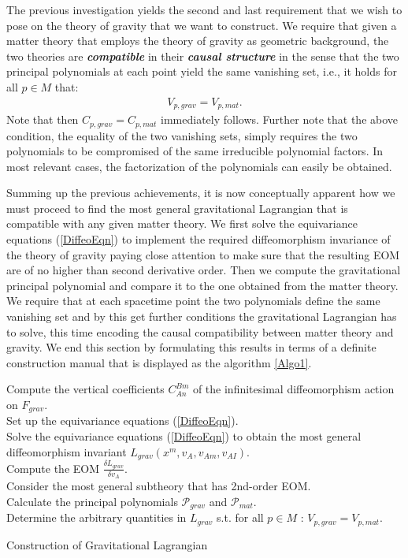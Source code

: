 The previous investigation yields the second and last requirement that we wish to pose on the theory of gravity that we want to construct. We require that given a matter theory that employs the theory of gravity as geometric background, the two theories are \textit{\textbf{compatible}} in their \textit{\textbf{causal structure}} in the sense that the two principal polynomials at each point yield the same vanishing set, i.e., it holds for all $p \in M$ that: 
\begin{align}
    V_{p,grav} = V_{p,mat}.
\end{align}
Note that then $C_{p,grav} = C_{p,mat}$ immediately follows. Further note that the above condition, the equality of the two vanishing sets, simply requires the two polynomials to be compromised of the same irreducible polynomial factors. In most relevant cases, the factorization of the polynomials can easily be obtained.


Summing up the previous achievements, it is now conceptually apparent how we must proceed to find the most general gravitational Lagrangian that is compatible with any given matter theory. We first solve the equivariance equations (\ref{DiffeoEqn}) to implement the required diffeomorphism invariance of the theory of gravity paying close attention to make sure that the resulting EOM are of no higher than second derivative order. Then we compute the gravitational principal polynomial and compare it to the one obtained from the matter theory. We require that at each spacetime point the two polynomials define the same vanishing set and by this get further conditions the gravitational Lagrangian has to solve, this time encoding the causal compatibility between matter theory and gravity.
We end this section by formulating this results in terms of a definite construction manual that is displayed as the algorithm \ref{Algo1}.
\begin{algorithm}[hbt!]
\SetAlgoLined
{}
Compute the vertical coefficients $C^{Bm}_{An}$ of the infinitesimal diffeomorphism action on $F_{grav}$. \\
Set up the equivariance equations (\ref{DiffeoEqn}). \\
Solve the equivariance equations (\ref{DiffeoEqn}) to obtain the most general diffeomorphism invariant $L_{grav}(x^m,v_A,v_{Am},v_{AI})$.\\
Compute the EOM $\frac{\delta L_{grav}}{\delta v_A}$.\\
Consider the most general subtheory that has 2nd-order EOM.\\
Calculate the principal polynomials $\mathcal{P}_{grav}$ and $\mathcal{P}_{mat}$.\\
Determine the arbitrary quantities in $L_{grav}$ s.t. for all $p \in M$ : $V_{p,grav} = V_{p,mat}.$
 \caption{Construction of Gravitational Lagrangian}\label{Algo1}
\end{algorithm}


